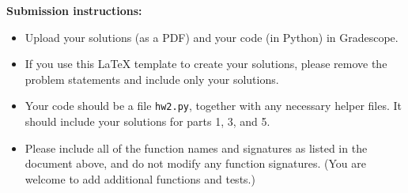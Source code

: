 \documentclass{article}
\begin{document}
\noindent
\textbf{Submission instructions:}
\begin{itemize}
\item Upload your solutions (as a PDF) and your code (in Python) in Gradescope.
\item If you use this LaTeX template to create your solutions, please remove the problem statements
and include only your solutions.
\item Your code should be a file \texttt{hw2.py}, together with any necessary helper files.
It should include your solutions for parts 1, 3, and 5.
\item Please include all of the function names and signatures as listed in the document above,
and do not modify any function signatures. (You are welcome to add additional functions and tests.)
\end{itemize}
\end{document}
